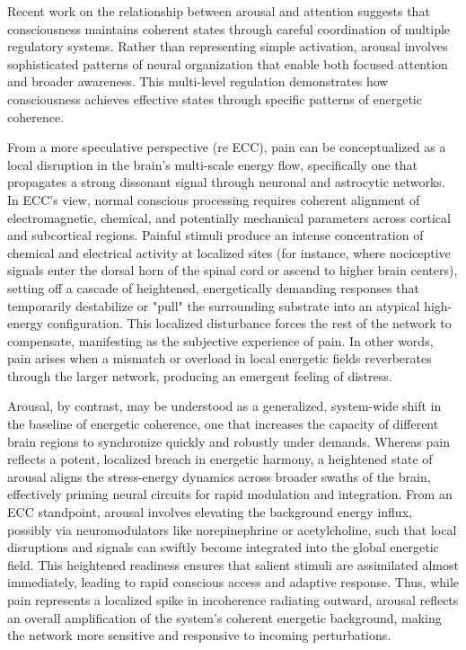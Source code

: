 Recent work on the relationship between arousal and attention \cite{Pfaff2006} suggests that consciousness maintains coherent states through careful coordination of multiple regulatory systems. Rather than representing simple activation, arousal involves sophisticated patterns of neural organization that enable both focused attention and broader awareness. This multi-level regulation demonstrates how consciousness achieves effective states through specific patterns of energetic coherence.

From a more speculative perspective (re ECC), pain can be conceptualized as a local disruption in the brain’s multi-scale energy flow, specifically one that propagates a strong dissonant signal through neuronal and astrocytic networks. In ECC’s view, normal conscious processing requires coherent alignment of electromagnetic, chemical, and potentially mechanical parameters across cortical and subcortical regions. Painful stimuli produce an intense concentration of chemical and electrical activity at localized sites (for instance, where nociceptive signals enter the dorsal horn of the spinal cord or ascend to higher brain centers), setting off a cascade of heightened, energetically demanding responses that temporarily destabilize or "pull" the surrounding substrate into an atypical high-energy configuration. This localized disturbance forces the rest of the network to compensate, manifesting as the subjective experience of pain. In other words, pain arises when a mismatch or overload in local energetic fields reverberates through the larger network, producing an emergent feeling of distress.

Arousal, by contrast, may be understood as a generalized, system-wide shift in the baseline of energetic coherence, one that increases the capacity of different brain regions to synchronize quickly and robustly under demands. Whereas pain reflects a potent, localized breach in energetic harmony, a heightened state of arousal aligns the stress-energy dynamics across broader swaths of the brain, effectively priming neural circuits for rapid modulation and integration. From an ECC standpoint, arousal involves elevating the background energy influx, possibly via neuromodulators like norepinephrine or acetylcholine, such that local disruptions and signals can swiftly become integrated into the global energetic field. This heightened readiness ensures that salient stimuli are assimilated almost immediately, leading to rapid conscious access and adaptive response. Thus, while pain represents a localized spike in incoherence radiating outward, arousal reflects an overall amplification of the system’s coherent energetic background, making the network more sensitive and responsive to incoming perturbations.

